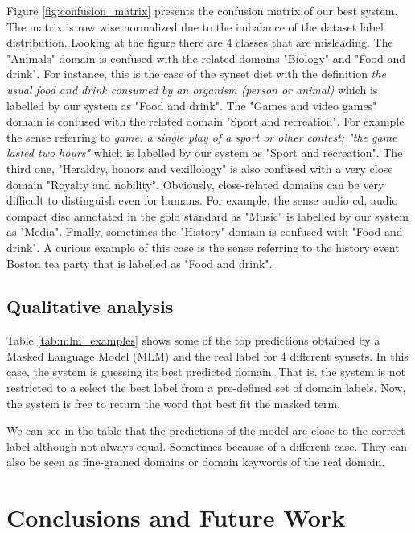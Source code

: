 \documentclass[11pt]{article}
\begin{document}
Figure \ref{fig:confusion_matrix} presents the confusion matrix of our best system. The matrix is row wise normalized due to the imbalance of the dataset label distribution. Looking at the figure there are 4 classes that are misleading. The "Animals" domain is confused with the related domains "Biology" and "Food and drink". For instance, this is the case of the synset diet with the definition {\it the usual food and drink consumed by an organism (person or animal)} which is labelled by our system as "Food and drink". The "Games and video games" domain is confused with the related domain "Sport and recreation". For example the sense referring to \textit{game: a single play of a sport or other contest; "the game lasted two hours"} which is labelled by our system as "Sport and recreation". The third one, "Heraldry, honors and vexillology" is also confused with a very close domain "Royalty and nobility". Obviously, close-related domains can be very difficult to distinguish even for humans. For example, the sense audio cd, audio compact disc annotated in the gold standard as "Music" is labelled by our system as "Media".
Finally, sometimes the "History" domain is confused with "Food and drink". A curious example of this case is the sense referring to the history event Boston tea party that is labelled as "Food and drink". 

\subsection{Qualitative analysis} \label{sseq:qualitative_analysis}

Table \ref{tab:mlm_examples} shows some of the top predictions obtained by a Masked Language Model (MLM) and the real label for 4 different synsets. In this case, the system is guessing its best predicted domain. That is, the system is not restricted to a select the best label from a pre-defined set of domain labels. Now, the system is free to return the word that best fit the masked term.



We can see in the table that the predictions of the model are  close to the correct label although not always equal. Sometimes because of a different case. They can also be seen as fine-grained domains or domain keywords of the real domain. 



\section{Conclusions and Future Work}
\label{conclusions}
\end{document}
